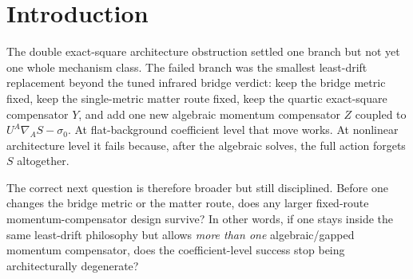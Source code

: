 \documentclass[11pt]{article}
\begin{document}
\begin{abstract}
But that same condition is the full exhaustion locus. Writing \(\mathbf M\) for the positive square root of \(\mathbf M^2\), the nonlinear momentum block becomes
\[
\mathcal L_{\Psi Z}
=
-\frac12
\left|
\mathbf M\bm Z-\mathbf M^{-1}\bm\alpha\,\Psi
\right|^2
-\frac12\Lambda_{\mathrm{mom}}\Psi^2.
\]
Hence on \(\Lambda_{\mathrm{mom}}=0\) the \(\bm Z\)-equations are algebraic, the whole momentum block vanishes after substitution, and the tuned \(Y\)-block has already removed the quartic scalar block. The full action therefore again becomes independent of \(S\), the ordered-flow equation collapses to an identity, and the same infinite-dimensional substrate fiber reappears over the same observer solution.

The conclusion is the smallest honest fixed-route exhaustion result now available. The least-drift momentum-compensator program is broader than the old single-\(Z\) note, but it still succeeds only by annihilating the ordered-flow equation. The active next burden is therefore no longer another algebraic/gapped momentum-compensator candidate with the same bridge and matter route. Any future candidate that still tries to keep those fixed must leave this class by introducing genuinely new structural input, or else the bridge metric or matter route must eventually be reconsidered.
\end{abstract}

\section{Introduction}

The double exact-square architecture obstruction settled one branch but not yet one whole mechanism class. The failed branch was the smallest least-drift replacement beyond the tuned infrared bridge verdict: keep the bridge metric fixed, keep the single-metric matter route fixed, keep the quartic exact-square compensator \(Y\), and add one new algebraic momentum compensator \(Z\) coupled to \(U^A\nabla_AS-\sigma_0\). At flat-background coefficient level that move works. At nonlinear architecture level it fails because, after the algebraic solves, the full action forgets \(S\) altogether.

The correct next question is therefore broader but still disciplined. Before one changes the bridge metric or the matter route, does any larger fixed-route momentum-compensator design survive? In other words, if one stays inside the same least-drift philosophy but allows \emph{more than one} algebraic/gapped momentum compensator, does the coefficient-level success stop being architecturally degenerate?
\end{document}
